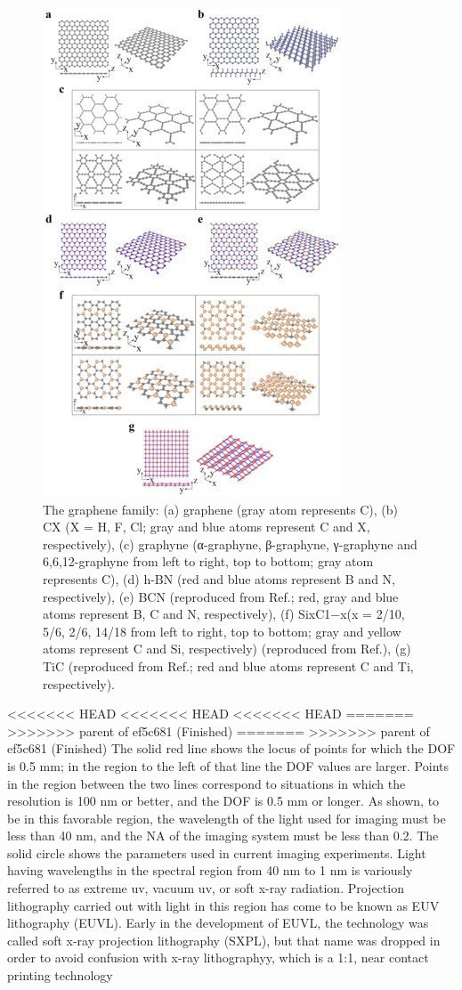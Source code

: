 \documentclass[12pt,a4paper]{report}
\begin{document}
\begin{figure}
  \centering
  \includegraphics[scale=0.3]{2.1.jpg}
  \caption{The graphene family: (a) graphene (gray atom represents C), (b) CX (X = H, F, Cl; gray and blue atoms represent C and X, respectively), (c) graphyne (α-graphyne, β-graphyne, γ-graphyne and 6,6,12-graphyne from left to right, top to bottom; gray atom represents C), (d) h-BN (red and blue atoms represent B and N, respectively), (e) BCN (reproduced from Ref.; red, gray and blue atoms represent B, C and N, respectively), (f) SixC1−x(x = 2/10, 5/6, 2/6, 14/18 from left to right, top to bottom; gray and yellow atoms represent C and Si, respectively) (reproduced from Ref.), (g) TiC (reproduced from Ref.; red and blue atoms represent C and Ti, respectively).}
  \label{graphenefam}
  \end{figure}

<<<<<<< HEAD
<<<<<<< HEAD
<<<<<<< HEAD
=======
>>>>>>> parent of ef5c681 (Finished)
=======
>>>>>>> parent of ef5c681 (Finished)
  The solid red line shows the locus of points for which the
DOF is 0.5 mm; in the region to the left of that line the
DOF values are larger. Points in the region between the
two lines correspond to situations in which the resolution
is 100 nm or better, and the DOF is 0.5 mm or longer. As
shown, to be in this favorable region, the wavelength of
the light used for imaging must be less than 40 nm, and
the NA of the imaging system must be less than 0.2. The
solid circle shows the parameters used in current imaging
experiments. Light having wavelengths in the spectral
region from 40 nm to 1 nm is variously referred to as
extreme uv, vacuum uv, or soft x-ray radiation.
Projection lithography carried out with light in this
region has come to be known as EUV lithography
(EUVL). Early in the development of EUVL, the
technology was called soft x-ray projection lithography
(SXPL), but that name was dropped in order to avoid
confusion with x-ray lithographyy, which is a 1:1, 
near contact printing technology
\end{document}
